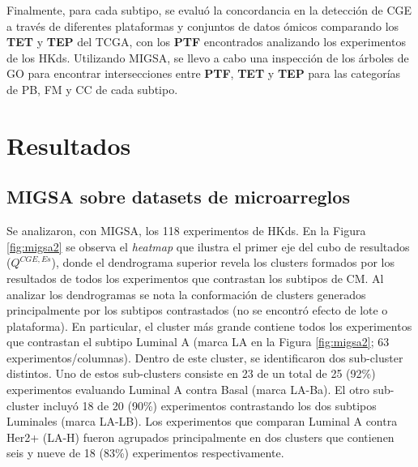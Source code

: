 \documentclass[12pt,twoside]{reedthesis}
\begin{document}
Finalmente, para cada subtipo, se evaluó la concordancia en la detección de CGE a través de diferentes plataformas y conjuntos de datos ómicos comparando los \textbf{TET} y \textbf{TEP} del TCGA, con los \textbf{PTF} encontrados analizando los experimentos de los HKds. Utilizando MIGSA, se llevo a cabo una inspección de los árboles de GO para encontrar intersecciones entre \textbf{PTF}, \textbf{TET} y \textbf{TEP} para las categorías de PB, FM y CC de cada subtipo.

\hypertarget{resultados-1}{%
\section{Resultados}\label{resultados-1}}

\hypertarget{migsa-sobre-datasets-de-microarreglos}{%
\subsection{MIGSA sobre datasets de microarreglos}\label{migsa-sobre-datasets-de-microarreglos}}

\par

Se analizaron, con MIGSA, los 118 experimentos de HKds. En la Figura \ref{fig:migsa2} se observa el \emph{heatmap} que ilustra el primer eje del cubo de resultados (\(Q^{CGE,Es}\)), donde el dendrograma superior revela los clusters formados por los resultados de todos los experimentos que contrastan los subtipos de CM. Al analizar los dendrogramas se nota la conformación de clusters generados principalmente por los subtipos contrastados (no se encontró efecto de lote o plataforma). En particular, el cluster más grande contiene todos los experimentos que contrastan el subtipo Luminal A (marca LA en la Figura \ref{fig:migsa2}; 63 experimentos/columnas). Dentro de este cluster, se identificaron dos sub-cluster distintos. Uno de estos sub-clusters consiste en 23 de un total de 25 (92\%) experimentos evaluando Luminal A contra Basal (marca LA-Ba). El otro sub-cluster incluyó 18 de 20 (90\%) experimentos contrastando los dos subtipos Luminales (marca LA-LB). Los experimentos que comparan Luminal A contra Her2+ (LA-H) fueron agrupados principalmente en dos clusters que contienen seis y nueve de 18 (83\%) experimentos respectivamente.

\par
\end{document}
